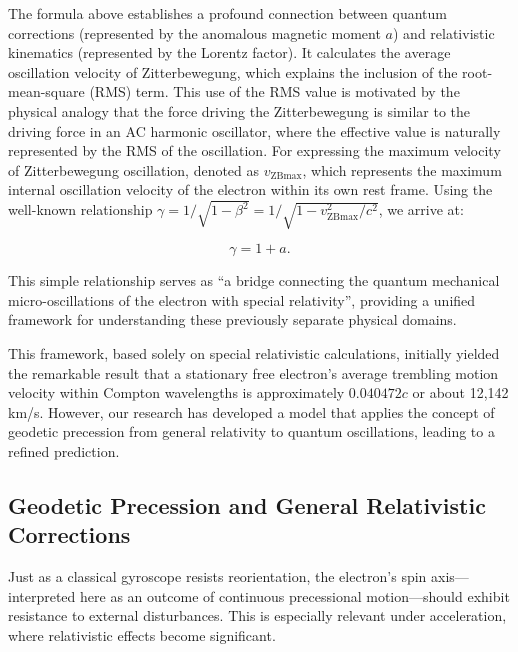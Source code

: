\documentclass[%
 reprint,
 amsmath,amssymb,
 aps,
]{revtex4-1}
\numberwithin{equation}{section}%
\begin{document}
The formula above establishes a profound connection between quantum corrections (represented by the anomalous magnetic moment $a$) and relativistic kinematics (represented by the Lorentz factor). It calculates the average oscillation velocity of Zitterbewegung, which explains the inclusion of the root-mean-square (RMS) term. This use of the RMS value is motivated by the physical analogy that the force driving the Zitterbewegung is similar to the driving force in an AC harmonic oscillator, where the effective value is naturally represented by the RMS of the oscillation. For expressing the maximum velocity of Zitterbewegung oscillation, denoted as $v_{\mathrm{ZBmax}}$, which represents the maximum internal oscillation velocity of the electron within its own rest frame. Using the well-known relationship $\gamma = 1/\sqrt{1 - \beta^2} = 1/\sqrt{1 - v_{\mathrm{ZBmax}}^2/c^2}$, we arrive at:

\begin{equation}
\gamma = 1 + a .
\label{eq:gamma_anomalous}
\end{equation}

\vspace{0.3cm}


This simple relationship serves as ``a bridge connecting the quantum mechanical micro-oscillations of the electron with special relativity'', providing a unified framework for understanding these previously separate physical domains.

This framework, based solely on special relativistic calculations, initially yielded the remarkable result that a stationary free electron's average trembling motion velocity within Compton wavelengths is approximately $0.040472c$ or about 12,142 km/s. However, our research has developed a model that applies the concept of geodetic precession from general relativity to quantum oscillations, leading to a refined prediction.

\subsection{Geodetic Precession and General Relativistic Corrections}

Just as a classical gyroscope resists reorientation, the electron's spin axis—interpreted here as an outcome of continuous precessional motion—should exhibit resistance to external disturbances. This is especially relevant under acceleration, where relativistic effects become significant.
\end{document}
